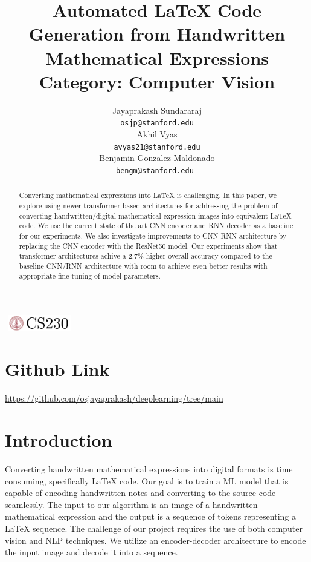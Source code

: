 \documentclass{article}
\title{Automated LaTeX Code Generation from Handwritten Mathematical Expressions \\
Category: Computer Vision}
\author{
  Jayaprakash Sundararaj \\
  \texttt{osjp@stanford.edu}  \\
  \AND
  Akhil Vyas \\
  \texttt{avyas21@stanford.edu}  \\
  \AND
  Benjamin Gonzalez-Maldonado \\
  \texttt{bengm@stanford.edu } \\
}
\begin{document}

\begin{center}
\includegraphics[width=3cm, height=0.7cm]{CS230}
\end{center}

\maketitle

\begin{abstract}
Converting mathematical expressions into LaTeX is challenging. In this paper, we explore using newer transformer based architectures for addressing the problem of converting handwritten/digital mathematical expression images into equivalent LaTeX code. We use the current state of the art CNN encoder and RNN decoder as a baseline for our experiments. We also investigate improvements to CNN-RNN architecture by replacing the CNN encoder with the ResNet50 model. Our experiments show that transformer architectures achive a \~2.7\% higher overall accuracy compared to the baseline CNN/RNN architecture with room to achieve even better results with appropriate fine-tuning of model parameters.
\end{abstract}

\section{Github Link}

\url{https://github.com/osjayaprakash/deeplearning/tree/main}

\section{Introduction}	

Converting handwritten mathematical expressions into digital formats is time consuming, specifically LaTeX code. Our goal is to train a ML model that is capable of encoding handwritten notes and converting to the source code seamlessly. The input to our algorithm is an image of a handwritten mathematical expression and the output is a sequence of tokens representing a LaTeX sequence. The challenge of our project requires the use of both computer vision and NLP techniques. We utilize an encoder-decoder architecture to encode the input image and decode it into a sequence.
\end{document}
